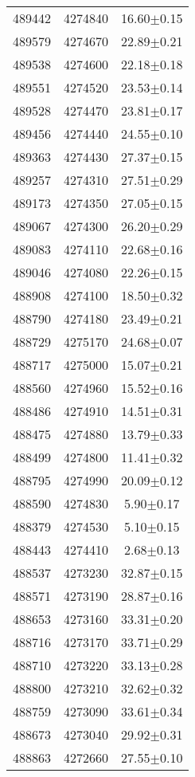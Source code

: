 \begin{center}
\begin{supertabular}{c c c}
489442	 & 	4274840	 & 	16.60$\pm$0.15\\ 
489579	 & 	4274670	 & 	22.89$\pm$0.21\\ 
489538	 & 	4274600	 & 	22.18$\pm$0.18\\ 
489551	 & 	4274520	 & 	23.53$\pm$0.14\\ 
489528	 & 	4274470	 & 	23.81$\pm$0.17\\ 
489456	 & 	4274440	 & 	24.55$\pm$0.10\\ 
489363	 & 	4274430	 & 	27.37$\pm$0.15\\ 
489257	 & 	4274310	 & 	27.51$\pm$0.29\\ 
489173	 & 	4274350	 & 	27.05$\pm$0.15\\ 
489067	 & 	4274300	 & 	26.20$\pm$0.29\\ 
489083	 & 	4274110	 & 	22.68$\pm$0.16\\ 
489046	 & 	4274080	 & 	22.26$\pm$0.15\\ 
488908	 & 	4274100	 & 	18.50$\pm$0.32\\ 
488790	 & 	4274180	 & 	23.49$\pm$0.21\\ 
488729	 & 	4275170	 & 	24.68$\pm$0.07\\ 
488717	 & 	4275000	 & 	15.07$\pm$0.21\\ 
488560	 & 	4274960	 & 	15.52$\pm$0.16\\ 
488486	 & 	4274910	 & 	14.51$\pm$0.31\\ 
488475	 & 	4274880	 & 	13.79$\pm$0.33\\ 
488499	 & 	4274800	 & 	11.41$\pm$0.32\\ 
488795	 & 	4274990	 & 	20.09$\pm$0.12\\ 
488590	 & 	4274830	 & 	5.90$\pm$0.17\\ 
488379	 & 	4274530	 & 	5.10$\pm$0.15\\ 
488443	 & 	4274410	 & 	2.68$\pm$0.13\\ 
488537	 & 	4273230	 & 	32.87$\pm$0.15\\ 
488571	 & 	4273190	 & 	28.87$\pm$0.16\\ 
488653	 & 	4273160	 & 	33.31$\pm$0.20\\ 
488716	 & 	4273170	 & 	33.71$\pm$0.29\\ 
488710	 & 	4273220	 & 	33.13$\pm$0.28\\ 
488800	 & 	4273210	 & 	32.62$\pm$0.32\\ 
488759	 & 	4273090	 & 	33.61$\pm$0.34\\ 
488673	 & 	4273040	 & 	29.92$\pm$0.31\\ 
488863	 & 	4272660	 & 	27.55$\pm$0.10\\ 

\end{supertabular}
\end{center}
